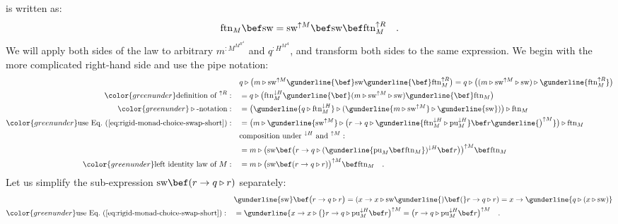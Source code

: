is written as:
\begin{equation}
\text{ftn}_{M}\bef\text{sw}=\text{sw}^{\uparrow M}\bef\text{sw}\bef\text{ftn}_{M}^{\uparrow R}\quad.\label{eq:swap-law-4-formulation-R-M}
\end{equation}
We will apply both sides of the law to arbitrary $m^{:M^{M^{R^{A}}}}$
and $q^{:H^{M^{A}}}$, and transform both sides to the same expression.
We begin with the more complicated right-hand side and use the pipe
notation:
\begin{align}
 & q\triangleright\big(m\triangleright\text{sw}^{\uparrow M}\gunderline{\bef}\text{sw}\gunderline{\bef}\text{ftn}_{M}^{\uparrow R}\big)=q\triangleright\big((m\triangleright\text{sw}^{\uparrow M}\triangleright\text{sw})\triangleright\gunderline{\text{ftn}_{M}^{\uparrow R}}\big)\nonumber \\
{\color{greenunder}\text{definition of }^{\uparrow R}:}\quad & =q\triangleright\big(\text{ftn}_{M}^{\downarrow H}\gunderline{\bef}(m\triangleright\text{sw}^{\uparrow M}\triangleright\text{sw})\gunderline{\bef}\text{ftn}_{M}\big)\nonumber \\
{\color{greenunder}\triangleright\text{-notation}:}\quad & =\big(\gunderline{q\triangleright\text{ftn}_{M}^{\downarrow H}}\triangleright(\gunderline{m\triangleright\text{sw}^{\uparrow M}}\triangleright\gunderline{\text{sw}})\big)\triangleright\text{ftn}_{M}\nonumber \\
{\color{greenunder}\text{use Eq.~(\ref{eq:rigid-monad-choice-swap-short})}:}\quad & =\big(m\triangleright\gunderline{\text{sw}^{\uparrow M}}\triangleright\big(r\rightarrow q\triangleright\gunderline{\text{ftn}_{M}^{\downarrow H}\triangleright\text{pu}_{M}^{\downarrow H}}\bef r\gunderline{\big)^{\uparrow M}}\big)\triangleright\text{ftn}_{M}\nonumber \\
 & \text{composition under }^{\downarrow H}\text{ and }^{\uparrow M}:\quad\nonumber \\
 & =m\triangleright\big(\text{sw}\bef\big(r\rightarrow q\triangleright(\gunderline{\text{pu}_{M}\bef\text{ftn}_{M}})^{\downarrow H}\bef r\big)\big)^{\uparrow M}\bef\text{ftn}_{M}\\
{\color{greenunder}\text{left identity law of }M:}\quad & =m\triangleright\big(\text{sw}\bef(r\rightarrow q\triangleright r)\big)^{\uparrow M}\bef\text{ftn}_{M}\quad.\label{eq:rigid-monad-1-swap-law-4-derivation-5}
\end{align}
Let us simplify the sub-expression $\text{sw}\bef(r\rightarrow q\triangleright r)$
separately:
\begin{align*}
 & \gunderline{\text{sw}}\bef\big(r\rightarrow q\triangleright r\big)=(x\rightarrow x\triangleright\text{sw}\gunderline{)\bef(}r\rightarrow q\triangleright r)=x\rightarrow\gunderline{q\triangleright(x\triangleright\text{sw})}\\
{\color{greenunder}\text{use Eq.~(\ref{eq:rigid-monad-choice-swap-short})}:}\quad & =\gunderline{x\rightarrow x\triangleright\big(}r\rightarrow q\triangleright\text{pu}_{M}^{\downarrow H}\bef r\big)^{\uparrow M}=\big(r\rightarrow q\triangleright\text{pu}_{M}^{\downarrow H}\bef r\big)^{\uparrow M}\quad.
\end{align*}
